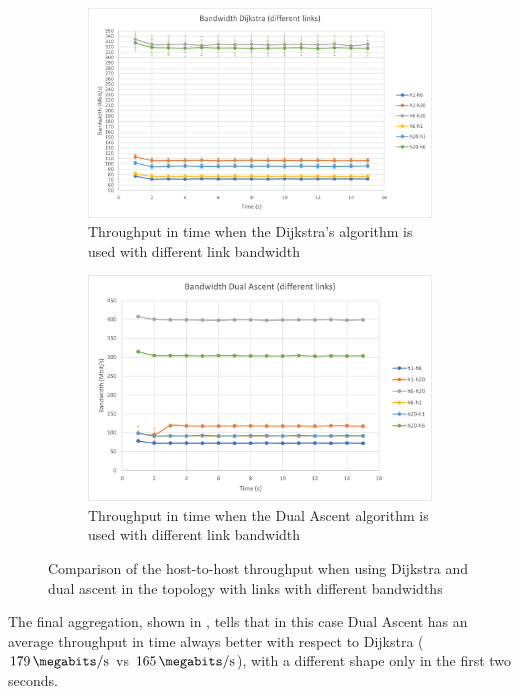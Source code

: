 \begin{figure}
	\centering
	\begin{subfigure}[b]{\textwidth}
		\includegraphics[width=\textwidth]{img/band-div-dijkstra.png}
		\caption{Throughput in time when the Dijkstra's algorithm is
		used with different link
	bandwidth}\label{subfig:band-div-dijkstra}
	\end{subfigure}
	\begin{subfigure}[b]{\textwidth}
		\centering
		\includegraphics[width=\textwidth]{img/band-div-dual.png}
		\caption{Throughput in time when the Dual Ascent algorithm is
		used with different link bandwidth}\label{subfig:band-div-dual}
	\end{subfigure}
	\caption{Comparison of the host-to-host throughput when using Dijkstra
	and dual ascent in the topology with links with different
	bandwidths}\label{fig:bandwidth-difflinks}
\end{figure}

The final aggregation, shown in , tells that in
this case Dual Ascent has an average throughput in time always better with
respect to Dijkstra (\(\SI{179}{\megabits\per\second}\) vs
\(\SI{165}{\megabits\per\second}\)), with a different shape only in the first
two seconds.


